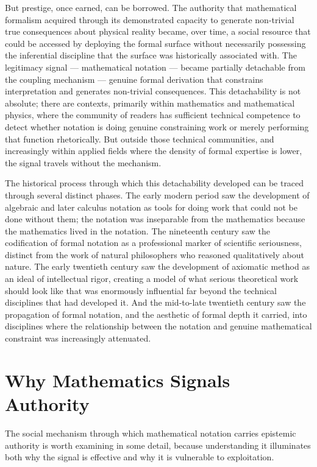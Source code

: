\documentclass[12pt, openright, twoside]{book}
\begin{document}
But prestige, once earned, can be borrowed. The authority that mathematical
formalism acquired through its demonstrated capacity to generate non-trivial
true consequences about physical reality became, over time, a social resource
that could be accessed by deploying the formal surface without necessarily
possessing the inferential discipline that the surface was historically
associated with. The legitimacy signal --- mathematical notation --- became
partially detachable from the coupling mechanism --- genuine formal derivation
that constrains interpretation and generates non-trivial consequences. This
detachability is not absolute; there are contexts, primarily within mathematics
and mathematical physics, where the community of readers has sufficient
technical competence to detect whether notation is doing genuine constraining
work or merely performing that function rhetorically. But outside those
technical communities, and increasingly within applied fields where the
density of formal expertise is lower, the signal travels without the mechanism.

The historical process through which this detachability developed can be
traced through several distinct phases. The early modern period saw the
development of algebraic and later calculus notation as tools for doing
work that could not be done without them; the notation was inseparable from
the mathematics because the mathematics lived in the notation. The nineteenth
century saw the codification of formal notation as a professional marker
of scientific seriousness, distinct from the work of natural philosophers
who reasoned qualitatively about nature. The early twentieth century saw the
development of axiomatic method as an ideal of intellectual rigor, creating
a model of what serious theoretical work should look like that was
enormously influential far beyond the technical disciplines that had developed
it. And the mid-to-late twentieth century saw the propagation of formal
notation, and the aesthetic of formal depth it carried, into disciplines
where the relationship between the notation and genuine mathematical
constraint was increasingly attenuated.

\section{Why Mathematics Signals Authority}

The social mechanism through which mathematical notation carries epistemic
authority is worth examining in some detail, because understanding it
illuminates both why the signal is effective and why it is vulnerable to
exploitation.
\end{document}
